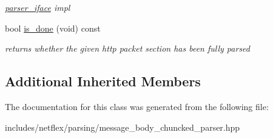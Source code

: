 \begin{DoxyCompactItemize}
\begin{DoxyCompactList}\small\item\em \hyperlink{classnetflex_1_1parsing_1_1parser__iface}{parser\+\_\+iface} impl \end{DoxyCompactList}\item 
\mbox{\label{classnetflex_1_1parsing_1_1message__body__chuncked__parser_ac5c76b0a25903f6ab1fd4050446175b4}} 
bool \hyperlink{classnetflex_1_1parsing_1_1message__body__chuncked__parser_ac5c76b0a25903f6ab1fd4050446175b4}{is\+\_\+done} (void) const
\begin{DoxyCompactList}\small\item\em returns whether the given http packet section has been fully parsed \end{DoxyCompactList}\end{DoxyCompactItemize}
\subsection*{Additional Inherited Members}


The documentation for this class was generated from the following file\+:\begin{DoxyCompactItemize}
\item 
includes/netflex/parsing/message\+\_\+body\+\_\+chuncked\+\_\+parser.\+hpp\end{DoxyCompactItemize}
